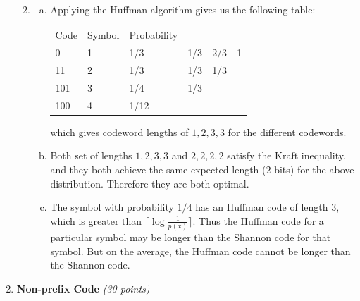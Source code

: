 \documentclass[12pt]{article}
\begin{document}
\begin{enumerate}
\begin{solution}
\begin{enumerate}[1)]
\begin{enumerate}[(a)]
\end{enumerate}








\item 
\begin{enumerate}[(a)]
\item Applying the Huffman algorithm gives us the following table:
\begin{table}[htbp]
\begin{center}
\begin{tabular}{llllll}
Code & Symbol & Probability &  &  & \\
0    & 1 & 1/3  & 1/3 & 2/3 & 1 \\
11   & 2 & 1/3  & 1/3 & 1/3 &  \\
101  & 3 & 1/4  & 1/3 &  &  \\ 
100  & 4 & 1/12 &  &  &  \\
\end{tabular}
\end{center}
\end{table}
which gives codeword lengths of $1,2,3,3$ for the different codewords.


\item Both set of lengths $1,2,3,3$ and $2,2,2,2$ satisfy the Kraft inequality, and they both achieve the same expected length ($2$ bits) for the above distribution. Therefore they are both optimal.

\item The symbol with probability $1/4$ has an Huffman code of length $3$, which is greater than $\lceil \log \frac{1}{p(x)} \rceil$. Thus the Huffman code for a particular symbol may be longer than the Shannon code for that symbol. But on the average, the Huffman code cannot be longer than the Shannon code.

\end{enumerate}
\end{enumerate}

\end{solution}

\begin{problem}
\end{problem}
\begin{problem}
\newpage
\end{problem}

\item{\bf Non-prefix Code} {\it (30 points)}\\


\end{enumerate}
\end{document}
